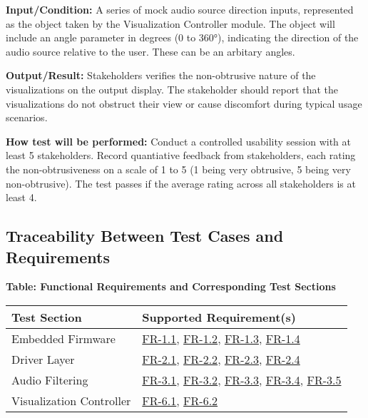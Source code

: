 \documentclass[12pt, titlepage]{article}
\begin{document}
\begin{enumerate}
\textbf{Input/Condition:} 
A series of mock audio source direction inputs, represented as the object taken 
by the Visualization Controller module. The object will include an angle 
parameter in degrees (0 to 360°), indicating the direction of the audio source 
relative to the user. These can be an arbitary angles.
					
\textbf{Output/Result:} 
Stakeholders verifies the non-obtrusive nature of the visualizations 
on the output display. The stakeholder should report that the visualizations do 
not obstruct their view or cause discomfort during typical usage scenarios.

\textbf{How test will be performed:} 
Conduct a controlled usability session with at least 5 stakeholders. Record 
quantiative feedback from stakeholders, each rating the non-obtrusiveness on a 
scale of 1 to 5 (1 being very obtrusive, 5 being very non-obtrusive). The test 
passes if the average rating across all stakeholders is at least 4.

\end{enumerate}

\subsection{Traceability Between Test Cases and Requirements}

\noindent
\textbf{Table: Functional Requirements and Corresponding Test Sections}

\noindent
\begin{tabular}{|l|l|}
\hline
\textbf{Test Section} & \textbf{Supported Requirement(s)} \\ \hline
Embedded Firmware & \hyperref[SRS-FR1_1]{FR-1.1}, \hyperref[SRS-FR1_2]{FR-1.2}, \hyperref[SRS-FR1_3]{FR-1.3}, \hyperref[SRS-FR1_4]{FR-1.4} \\ \hline
Driver Layer & \hyperref[SRS-FR2_1]{FR-2.1}, \hyperref[SRS-FR2_2]{FR-2.2}, \hyperref[SRS-FR2_3]{FR-2.3}, \hyperref[SRS-FR2_4]{FR-2.4} \\ \hline
Audio Filtering & \hyperref[SRS-FR3_1]{FR-3.1}, \hyperref[SRS-FR3_2]{FR-3.2}, \hyperref[SRS-FR3_3]{FR-3.3}, \hyperref[SRS-FR3_4]{FR-3.4}, \hyperref[SRS-FR3_5]{FR-3.5} \\ \hline
Visualization Controller & \hyperref[SRS-FR6_1]{FR-6.1}, \hyperref[SRS-FR6_2]{FR-6.2} \\ \hline
\end{tabular}

\vspace{0.5cm}
\end{document}
